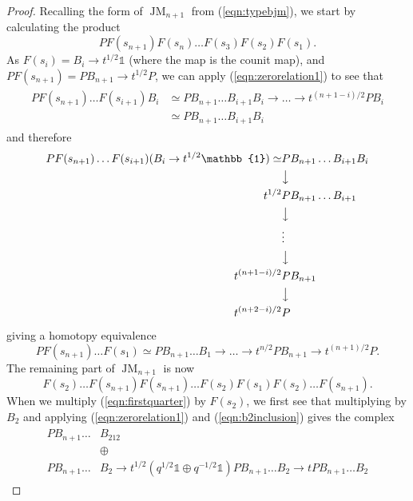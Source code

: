 \documentclass[11pt]{article}
\DeclareMathOperator{\JM}{JM}
\theoremstyle{definition}
\theoremstyle{remark}
\numberwithin{equation}{section}
\begin{document}
\begin{proof}
	Recalling the form of $\JM_{n+1}$ from (\ref{eqn:typebjm}), we start by
	calculating the product
	\[PF(s_{n+1})F(s_n)\dots F(s_3)F(s_2)F(s_1).\]
	As $F(s_{i})=B_i\to t^{1/2}\mathbb{1}$ (where the map is the counit map),
	and $PF(s_{n+1})=PB_{n+1}\to t^{1/2}P$, we can apply
	(\ref{eqn:zerorelation1}) to see that
\begin{align*}
\begin{split}
PF(s_{n+1})\dots F(s_{i+1})B_i &\simeq PB_{n+1}\dots B_{i+1}B_i
\to \dots \to t^{(n+1-i)/2} PB_i \\
					 &\simeq PB_{n+1}\dots B_{i+1}B_i
\end{split}
\end{align*}
and therefore
\begin{align*}
\begin{split}
	PF(s_{n+1})\dots F(s_{i+1})(B_i \to t^{1/2}\mathbb{1}) \simeq
	&PB_{n+1}\dots B_{i+1} B_i \\
	&{\big\downarrow} \\
	t^{1/2}&PB_{n+1}\dots B_{i+1} \\
	&{\big\downarrow} \\
	       &\vdots\\
	&{\big\downarrow} \\
	t^{(n+1-i)/2} &PB_{n+1} \\
	       &{\big\downarrow}\\
	t^{(n+2-i)/2}&P
\end{split}
\end{align*}
giving a homotopy equivalence
\begin{equation}
\label{eqn:firstquarter}
PF(s_{n+1})\dots F(s_1)\simeq
PB_{n+1}\dots B_1 \to \dots \to t^{n/2}PB_{n+1} \to t^{(n+1)/2} P.
\end{equation}
The remaining part of $\JM_{n+1}$ is now \[F(s_2)\dots F(s_{n+1})
F(s_{n+1})\dots F(s_2)F(s_1)F(s_2)\dots F(s_{n+1}).\]
When we multiply (\ref{eqn:firstquarter}) by $F(s_2)$, we first see that
multiplying by $B_2$ and applying (\ref{eqn:zerorelation1}) and
(\ref{eqn:b2inclusion}) gives the complex
\begin{align*}
	\begin{split}
		PB_{n+1}\dots &B_{212}  \\
		&\oplus \\
		PB_{n+1}\dots &B_{2} \to t^{1/2}(q^{1/2}\mathbb{1} \oplus
		q^{-1/2}\mathbb{1})
		PB_{n+1}\dots B_{2} \to tPB_{n+1}\dots B_{2}
\end{split}
\end{align*}

\end{proof}
\end{document}

